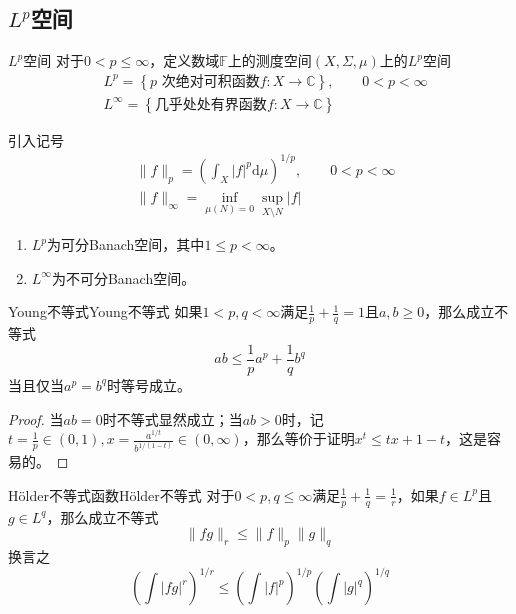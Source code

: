 \documentclass[lang = cn, scheme = chinese, thmcnt = section]{elegantbook}
\newcommand{\C}{\mathbb{C}}  		   %
\begin{document}
\subsection{$L^p$空间}

\begin{definition}{$L^p$空间}
	对于$0< p \le \infty$，定义数域$\mathbb{F}$上的测度空间$(X,\Sigma,\mu)$上的$L^p$空间
	\nonumber\begin{align}
		&L^p=\left\{ p\text{ 次绝对可积函数}f:X\to\C \right\},\qquad 0< p<\infty\\
		&L^\infty=\left\{ \text{几乎处处有界函数}f:X\to\C \right\}
	\end{align}
	
	引入记号
	\nonumber\begin{align}
		&\|  f \|_p=\left( \int_X |f|^p\mathrm{d}\mu \right)^{1/p},\qquad 0< p<\infty\\
		&\|f\|_\infty=\inf_{\mu(N)=0}\sup_{X\setminus N}|f|
	\end{align}
\end{definition}

\begin{theorem}
	\begin{enumerate}
		\item $L^p$为可分Banach空间，其中$1\le p<\infty$。
		\item $L^\infty$为不可分Banach空间。
	\end{enumerate}
\end{theorem}

\begin{theorem}{Young不等式}{Young不等式}
	如果$1< p,q <\infty$满足$\frac{1}{p}+\frac{1}{q}=1$且$a,b\ge 0$，那么成立不等式
	$$
	ab\le \frac{1}{p}a^p+\frac{1}{q}b^q
	$$
	当且仅当$a^p=b^q$时等号成立。
\end{theorem}

\begin{proof}
	当$ab=0$时不等式显然成立；当$ab>0$时，记$t=\frac{1}{p}\in(0,1),x=\frac{a^{1/t}}{b^{1/(1-t)}}\in(0,\infty)$，那么等价于证明$x^t\le tx+1-t$，这是容易的。
\end{proof}

\begin{theorem}{Hölder不等式}{函数Hölder不等式}
	对于$0< p,q \le\infty$满足$\frac{1}{p}+\frac{1}{q}=\frac{1}{r}$，如果$f\in L^p$且$g\in L^q$，那么成立不等式
	$$
	\| fg \|_r\le\|f\|_p \|g\|_q
	$$
	换言之
	$$
	\left(\int |fg|^r\right)^{1/r}
	\le \left(\int |f|^p\right)^{1/p}\left(\int |g|^q\right)^{1/q}
	$$
\end{theorem}
\end{document}
